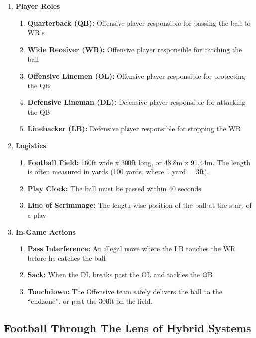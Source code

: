 \begin{enumerate}
    \item \textbf{Player Roles}
        \begin{enumerate}
            \item \textbf{Quarterback (QB):} Offensive player responsible for passing the ball to WR’s
            \item \textbf{Wide Receiver (WR):} Offensive player responsible for catching the ball 
            \item \textbf{Offensive Linemen (OL):} Offensive player responsible for protecting the QB 
            \item \textbf{Defensive Lineman (DL):} Defensive player responsible for attacking the QB
            \item \textbf{Linebacker (LB):} Defensive player responsible for stopping the WR
        \end{enumerate}
    \item \textbf{Logistics}
        \begin{enumerate}
            \item \textbf{Football Field:} 160ft wide x 300ft long, or 48.8m x 91.44m. The length is often measured in yards (100 yards, where 1 yard = 3ft). 
            \item \textbf{Play Clock:} The ball must be passed within 40 seconds
            \item \textbf{Line of Scrimmage:} The length-wise position of the ball at the start of a play
        \end{enumerate}
    \item \textbf{In-Game Actions}
        \begin{enumerate}
            \item \textbf{Pass Interference:} An illegal move where the LB touches the WR before he catches the ball 
            \item \textbf{Sack:} When the DL breaks past the OL and tackles the QB
            \item \textbf{Touchdown:} The Offensive team safely delivers the ball to the “endzone”, or past the 300ft on the field.

        \end{enumerate}
\end{enumerate}

\subsection{Football Through The Lens of Hybrid Systems}

